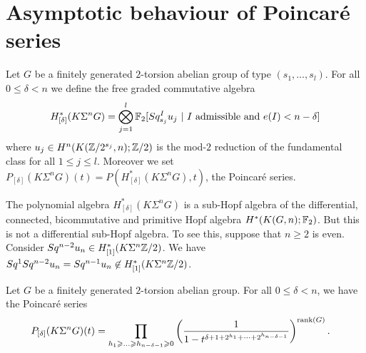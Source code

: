\section{Asymptotic behaviour of Poincar\'e series}

\begin{defn}
Let $G$ be a finitely generated $2$-torsion abelian group of type $(s_1,\dots,s_l)$. For all $0\leq\delta<n$ we define the free graded commutative algebra
$$
H^*_{[\delta]}(K\Sigma^n G)=\bigotimes_{j=1}^l\mathbb{F}_2[Sq^I_{s_j}u_j\ |\ \text{$I$ admissible and $e(I)<n-\delta$}]
$$ where $u_j\in H^n(K(\mathbb{Z}/2^{s_j},n);\mathbb{Z}/2)$ is the mod-$2$ reduction of the fundamental class for all $1\leq j\leq l$. Moreover we set $P_{[\delta]}(K\Sigma^n G)(t)=P(H^*_{[\delta]}(K\Sigma^n G),t)$, the Poincar\'e series.
\end{defn}

\begin{rem}
The polynomial algebra $H^*_{[\delta]}(K\Sigma^n G)$ is a sub-Hopf algebra of the differential, connected, bicommutative and primitive Hopf algebra $H^*(K(G,n);\mathbb{F}_2)$. But this is not a differential sub-Hopf algebra. To see this, suppose that $n\geq2$ is even. Consider $Sq^{n-2}u_n\in H^*_{[1]}(K\Sigma^n\mathbb{Z}/2)$. We have $Sq^1Sq^{n-2}u_n=Sq^{n-1}u_n\not\in H^*_{[1]}(K\Sigma^n\mathbb{Z}/2)$.
\end{rem}

\begin{lem}\label{l:a proof for Serre's result}
Let $G$ be a finitely generated $2$-torsion abelian group. For all $0\leq\delta<n$, we have the Poincar\'e series
\begin{align*}
P_{[\delta]}(K\Sigma^n G)(t)&=\prod_{h_1\geq\dots\geq h_{n-\delta-1}\geq0}\left({1\over1-t^{\delta+1+2^{h_1}+\dots+2^{h_{n-\delta-1}}}}\right)^{\rk(G)}.
\end{align*}
\end{lem}

